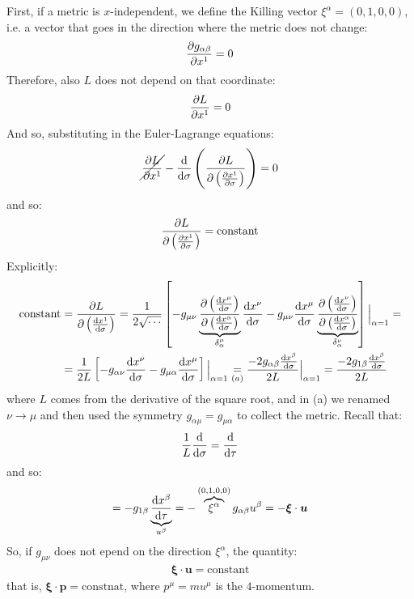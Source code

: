 \documentclass[../template.tex]{subfiles}
\begin{document}
First, if a metric is $x$-independent, we define the Killing vector $\xi^\alpha = (0,1,0,0)$, i.e. a vector that goes in the direction where the metric does not change:
\begin{align*}
    \pdv{g_{\alpha \beta}}{x^1} = 0
\end{align*}  
Therefore, also $L$ does not depend on that coordinate:
\begin{align*}
    \pdv{L}{x^1} = 0
\end{align*}  
And so, substituting in the Euler-Lagrange equations:
\begin{align*}
    \cancel{\pdv{L}{x^1}} - \dv{\sigma} \left(\pdv{L}{\left(\pdv{x^1}{\sigma}\right)}\right) = 0
\end{align*}
and so:
\begin{align*}
    \pdv{L}{\left(\pdv{x^1}{\sigma}\right)} = \text{constant}
\end{align*}
Explicitly:
\begin{align*}
    \text{constant} &= \pdv{L}{\left(\dv{x^1}{\sigma}\right)} = 
    \frac{1}{2 \sqrt{\cdots}} \left[-g_{\mu \nu} \underbrace{\pdv{\left(\dv{x^\mu}{\sigma}\right)}{\left(\dv{x^\alpha}{\sigma}\right)}}_{\delta^{\mu}_\alpha}\dv{x^\nu}{\sigma} - g_{\mu \nu} \dv{x^\mu}{\sigma}\underbrace{\pdv{\left(\dv{x^\nu}{\sigma}\right)}{\left(\dv{x^\alpha}{\sigma}\right)}}_{\delta^{\nu}_\alpha}\right] \Big|_{\alpha = 1}= \\
    &= \frac{1}{2L}\left[-g_{\alpha \nu} \dv{x^\nu}{\sigma} - g_{\mu \alpha} \dv{x^\mu}{\sigma}\right] \Big|_{\alpha =1} \underset{(a)}{=} 
    \frac{-2 g_{\alpha \beta} \dv{x^\beta}{\sigma}}{2 L} \Big|_{\alpha = 1} = \frac{-2 g_{1 \beta} \dv{x^\beta}{\sigma}}{2 L} 
\end{align*}
where $L$ comes from the derivative of the square root, and in (a) we renamed $\nu \to \mu$ and then used the symmetry $g_{\alpha \mu} = g_{\mu \alpha}$ to collect the metric. Recall that:
\begin{align*}
    \frac{1}{L} \dv{\sigma} = \dv{\tau} 
\end{align*}
and so:
\begin{align*}
    = -g_{1\beta} \underbrace{\dv{x^\beta}{\tau}}_{u^\beta} = -\overbrace{\xi^\alpha}^{(0,1,0,0)} g_{\alpha \beta} u^\beta = -\bm{\xi} \cdot \bm{u}
\end{align*}
So, if $g_{\mu \nu}$ does not epend on the direction $\xi^\alpha$, the quantity:
\begin{align*}
    \bm{\xi} \cdot \bm{u} = \text{constant}
\end{align*}  
that is, $\bm{\xi} \cdot \bm{p} = \text{constnat}$, where $p^\mu = m u^\mu$ is the $4$-momentum.
\end{document}
